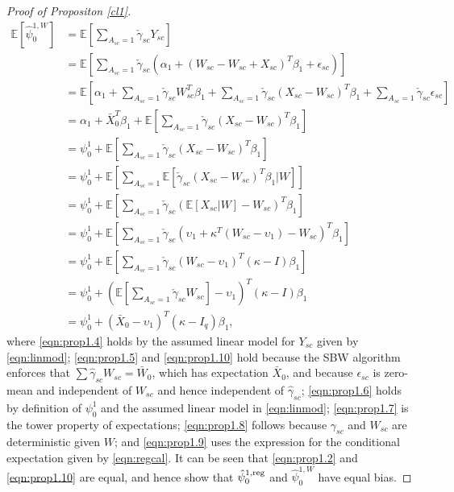 \begin{proof}[Proof of Propositon \ref{cl1}]
\begin{align}
\nonumber	\mathbb{E}[\hat{\psi}_0^{1, W}] & = \mathbb{E}\left[ \sum_{A_{sc} = 1} \check{\gamma}_{sc} Y_{sc}\right] \\
	& = \mathbb{E}\left[ \sum_{A_{sc}=1} \check{\gamma}_{sc} \left(\alpha_1 + (W_{sc} - W_{sc} + X_{sc})^T \beta_1 + \epsilon_{sc}\right)\right] \label{eqn:prop1.4}\\
\nonumber	& = \mathbb{E}\left[ \alpha_1 + \sum_{A_{sc} = 1} \check{\gamma}_{sc} W_{sc}^T \beta_1 + \sum_{A_{sc}=1} \check{\gamma}_{sc} (X_{sc} - W_{sc})^T \beta_1 + \sum_{A_{sc}=1} \check{\gamma}_{sc} \epsilon_{sc} \right] \\
	& = \alpha_1 + \bar{X}_0^T\beta_1 + \mathbb{E}\left[ \sum_{A_{sc} = 1} \check{\gamma}_{sc}(X_{sc} - W_{sc})^T \beta_1\right] \label{eqn:prop1.5}\\
	& = \psi_0^1 + \mathbb{E} \left[ \sum_{A_{sc} = 1} \check{\gamma}_{sc}(X_{sc} - W_{sc})^T \beta_1 \right] \label{eqn:prop1.6} \\
	& = \psi_0^1 + \mathbb{E} \left[ \sum_{A_{sc} = 1} \mathbb{E}\left[ \check{\gamma}_{sc}(X_{sc} - W_{sc})^T \beta_1 | W \right] \right] \label{eqn:prop1.7} \\
	& = \psi_0^1 + \mathbb{E} \left[ \sum_{A_{sc} = 1}  \check{\gamma}_{sc} (\mathbb{E}[X_{sc}|W] - W_{sc})^T \beta_1 \right] \label{eqn:prop1.8} \\
	& = \psi_0^1 + \mathbb{E} \left[ \sum_{A_{sc} = 1}  \check{\gamma}_{sc} (\upsilon_1 + \kappa^T(W_{sc} - \upsilon_1) - W_{sc})^T \beta_1 \right] \label{eqn:prop1.9} \\
\nonumber	& = \psi_0^1 + \mathbb{E} \left[ \sum_{A_{sc} = 1}  \check{\gamma}_{sc} (W_{sc} - \upsilon_1)^T(\kappa - I)\beta_1 \right] \\
\nonumber	& = \psi_0^1 + \left(\mathbb{E}\left[\sum_{A_{sc} = 1} \check{\gamma}_{sc} W_{sc}\right] - \upsilon_1\right)^T(\kappa - I)\beta_1  \\
	& = \psi_0^1 + \left(\bar{X}_0 - \upsilon_1\right)^T(\kappa - I_q)\beta_1,  \label{eqn:prop1.10}
\end{align}
%
where \eqref{eqn:prop1.4} holds by the assumed linear model for $Y_{sc}$ given by  \eqref{eqn:linmod}; \eqref{eqn:prop1.5} and \eqref{eqn:prop1.10} hold because the SBW algorithm enforces that $\sum \hat{\gamma}_{sc} W_{sc} = \bar{W}_0$, which has expectation $\bar{X}_0$, and because $\epsilon_{sc}$ is zero-mean and independent of $W_{sc}$ and hence independent of $\hat{\gamma}_{sc}$; \eqref{eqn:prop1.6} holds by definition of $\psi_0^1$ and the assumed linear model in \eqref{eqn:linmod}; \eqref{eqn:prop1.7} is the tower property of expectations; \eqref{eqn:prop1.8} follows because $\gamma_{sc}$ and $W_{sc}$ are deterministic given $W$; and \eqref{eqn:prop1.9} uses the expression for the conditional expectation given by \eqref{eqn:regcal}. It can be seen that \eqref{eqn:prop1.2} and \eqref{eqn:prop1.10} are equal, and hence show that $\hat{\psi}_0^{1,\textup{reg}}$ and $\hat{\psi}_0^{1,W}$ have equal bias.


\end{proof}
